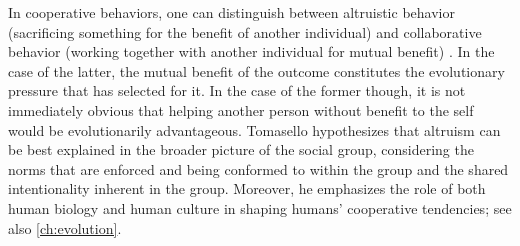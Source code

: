 In cooperative behaviors, one can distinguish between altruistic behavior (sacrificing something for the benefit of another individual) and collaborative behavior (working together with another individual for mutual benefit) \citep{Tomasello09}. In the case of the latter, the mutual benefit of the outcome constitutes the evolutionary pressure that has selected for it. In the case of the former though, it is not immediately obvious that helping another person without benefit to the self would be evolutionarily advantageous. Tomasello hypothesizes that altruism can be best explained in the broader picture of the social group, considering the norms that are enforced and being conformed to within the group and the shared intentionality inherent in the group.
Moreover, he emphasizes the role of both human biology and human culture in shaping humans' cooperative tendencies; see also \cref{ch:evolution}.

